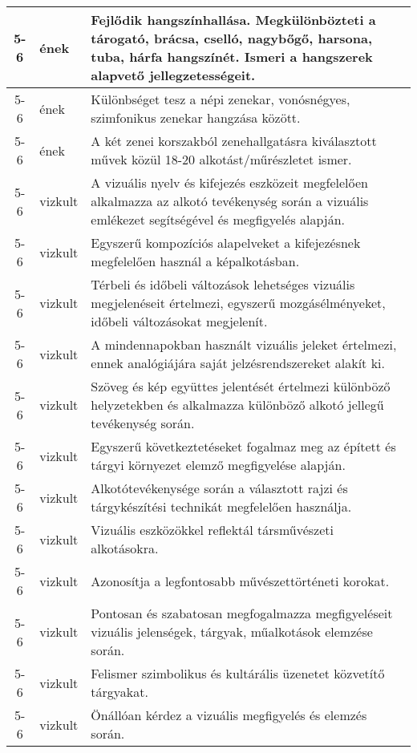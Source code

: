 \begin{small}
\begin{longtable}{c | p{2cm} |  p{11cm} }
              5-6 & ének & Fejlődik hangszínhallása. Megkülönbözteti a tárogató, brácsa, cselló, nagybőgő, harsona, tuba, hárfa hangszínét. Ismeri a hangszerek alapvető jellegzetességeit. \\ \hline
              5-6 & ének & Különbséget tesz a népi zenekar, vonósnégyes, szimfonikus zenekar hangzása között. \\ \hline
              5-6 & ének & A két zenei korszakból zenehallgatásra kiválasztott művek közül 18-20 alkotást/műrészletet ismer. \\ \hline
              5-6 & vizkult & A vizuális nyelv és kifejezés eszközeit megfelelően alkalmazza az alkotó tevékenység során a vizuális emlékezet segítségével és megfigyelés alapján. \\ \hline
              5-6 & vizkult & Egyszerű kompozíciós alapelveket a kifejezésnek megfelelően használ a képalkotásban. \\ \hline
              5-6 & vizkult & Térbeli és időbeli változások lehetséges vizuális megjelenéseit értelmezi, egyszerű mozgásélményeket, időbeli változásokat megjelenít. \\ \hline
              5-6 & vizkult & A mindennapokban használt vizuális jeleket értelmezi, ennek analógiájára saját jelzésrendszereket alakít ki. \\ \hline
              5-6 & vizkult & Szöveg és kép együttes jelentését értelmezi különböző helyzetekben és alkalmazza különböző alkotó jellegű tevékenység során. \\ \hline
              5-6 & vizkult & Egyszerű következtetéseket fogalmaz meg az épített és tárgyi környezet elemző megfigyelése alapján. \\ \hline
              5-6 & vizkult & Alkotótevékenysége során a választott rajzi és tárgykészítési technikát megfelelően használja. \\ \hline
              5-6 & vizkult & Vizuális eszközökkel reflektál társművészeti alkotásokra. \\ \hline
              5-6 & vizkult & Azonosítja a legfontosabb művészettörténeti korokat. \\ \hline
              5-6 & vizkult & Pontosan és szabatosan megfogalmazza megfigyeléseit vizuális jelenségek, tárgyak, műalkotások elemzése során. \\ \hline
              5-6 & vizkult & Felismer szimbolikus és kultárális üzenetet közvetítő tárgyakat. \\ \hline
              5-6 & vizkult & Önállóan kérdez a vizuális megfigyelés és elemzés során. \\ \hline

\end{longtable}
\end{small}
